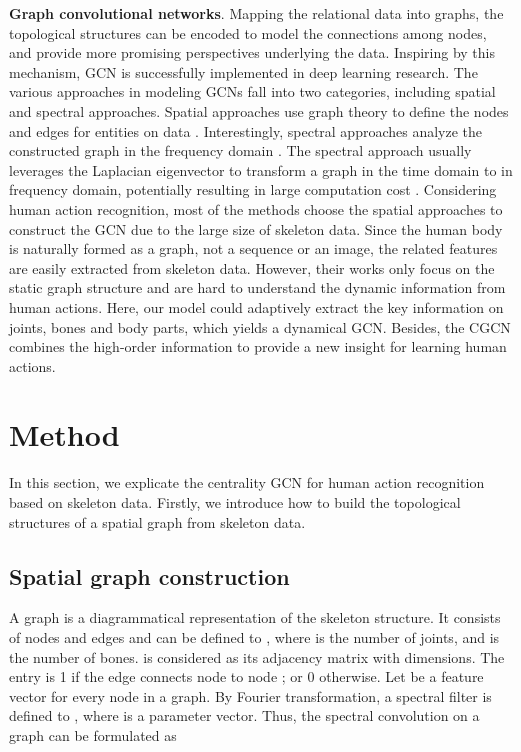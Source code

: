 \documentclass[runningheads]{llncs}
\begin{document}
\textbf{Graph convolutional networks}. Mapping the relational data into graphs, the topological structures can be encoded to model the connections among nodes, and provide more promising perspectives underlying the data. Inspiring by this mechanism, GCN is successfully implemented in deep learning research.  The various approaches in modeling GCNs fall into two categories, including spatial and spectral approaches. Spatial approaches use graph theory to define the nodes and edges for entities on data \cite{duvenaud2015convolutional,atwood2016diffusion}. Interestingly, spectral approaches analyze the constructed graph in the frequency domain \cite{henaff2015deep,defferrard2016convolutional}. The spectral approach usually leverages the Laplacian eigenvector to transform a graph in the time domain to in frequency domain, potentially resulting in large computation cost \cite{henaff2015deep}. Considering human action recognition, most of the methods choose the spatial approaches to construct the GCN due to the large size of skeleton data. Since the human body is naturally formed as a graph, not a sequence or an image, the related features are easily extracted from skeleton data. However, their works only focus on the static graph structure and are hard to understand the dynamic information from human actions.  Here, our model could adaptively extract the key information on joints, bones and body parts, which yields a dynamical GCN. Besides, the CGCN combines the high-order information to provide a new insight for learning human actions.

\section{Method}
In this section, we explicate the centrality GCN for human action recognition based on skeleton data. Firstly, we introduce how to build the topological structures of a spatial graph from skeleton data.

\subsection{Spatial graph construction}

A graph is a diagrammatical representation of the skeleton structure. It consists of nodes and edges and can be defined to , where  is the number of joints, and  is the number of bones.  is considered as its adjacency matrix with  dimensions. The entry  is 1 if the edge connects node  to node ; or 0 otherwise. Let  be a feature vector for every node in a graph. By Fourier transformation, a spectral filter is defined to , where  is a parameter vector. Thus, the spectral convolution on a graph can be formulated as
\end{document}

